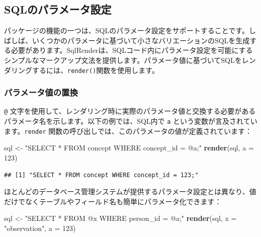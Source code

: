 \documentclass[
  11pt]{book}
\newenvironment{Shaded}{\begin{snugshade}}{\end{snugshade}}
\newcommand{\AttributeTok}[1]{\textcolor[rgb]{0.13,0.29,0.53}{#1}}
\newcommand{\DecValTok}[1]{\textcolor[rgb]{0.00,0.00,0.81}{#1}}
\newcommand{\FunctionTok}[1]{\textcolor[rgb]{0.13,0.29,0.53}{\textbf{#1}}}
\newcommand{\NormalTok}[1]{#1}
\newcommand{\OtherTok}[1]{\textcolor[rgb]{0.56,0.35,0.01}{#1}}
\newcommand{\StringTok}[1]{\textcolor[rgb]{0.31,0.60,0.02}{#1}}
\theoremstyle{definition}
\theoremstyle{definition}
\theoremstyle{definition}
\theoremstyle{definition}
\theoremstyle{remark}
\begin{document}
\subsection{SQLのパラメータ設定}\label{sqlux306eux30d1ux30e9ux30e1ux30fcux30bfux8a2dux5b9a}

パッケージの機能の一つは、SQLのパラメータ設定をサポートすることです。しばしば、いくつかのパラメータに基づいて小さなバリエーションのSQLを生成する必要があります。SqlRenderは、SQLコード内にパラメータ設定を可能にするシンプルなマークアップ文法を提供します。パラメータ値に基づいてSQLをレンダリングするには、\texttt{render()}関数を使用します。 

\subsubsection*{パラメータ値の置換}\label{ux30d1ux30e9ux30e1ux30fcux30bfux5024ux306eux7f6eux63db}

\texttt{@} 文字を使用して、レンダリング時に実際のパラメータ値と交換する必要があるパラメータ名を示します。以下の例では、SQL内で \texttt{a} という変数が言及されています。\texttt{render} 関数の呼び出しでは、このパラメータの値が定義されています：

\begin{Shaded}
\begin{Highlighting}[]
\NormalTok{sql }\OtherTok{\textless{}{-}} \StringTok{"SELECT * FROM concept WHERE concept\_id = @a;"}
\FunctionTok{render}\NormalTok{(sql, }\AttributeTok{a =} \DecValTok{123}\NormalTok{)}
\end{Highlighting}
\end{Shaded}

\begin{verbatim}
## [1] "SELECT * FROM concept WHERE concept_id = 123;"
\end{verbatim}

ほとんどのデータベース管理システムが提供するパラメータ設定とは異なり、値だけでなくテーブルやフィールド名も簡単にパラメータ化できます：

\begin{Shaded}
\begin{Highlighting}[]
\NormalTok{sql }\OtherTok{\textless{}{-}} \StringTok{"SELECT * FROM @x WHERE person\_id = @a;"}
\FunctionTok{render}\NormalTok{(sql, }\AttributeTok{x =} \StringTok{"observation"}\NormalTok{, }\AttributeTok{a =} \DecValTok{123}\NormalTok{)}
\end{Highlighting}
\end{Shaded}
\end{document}
